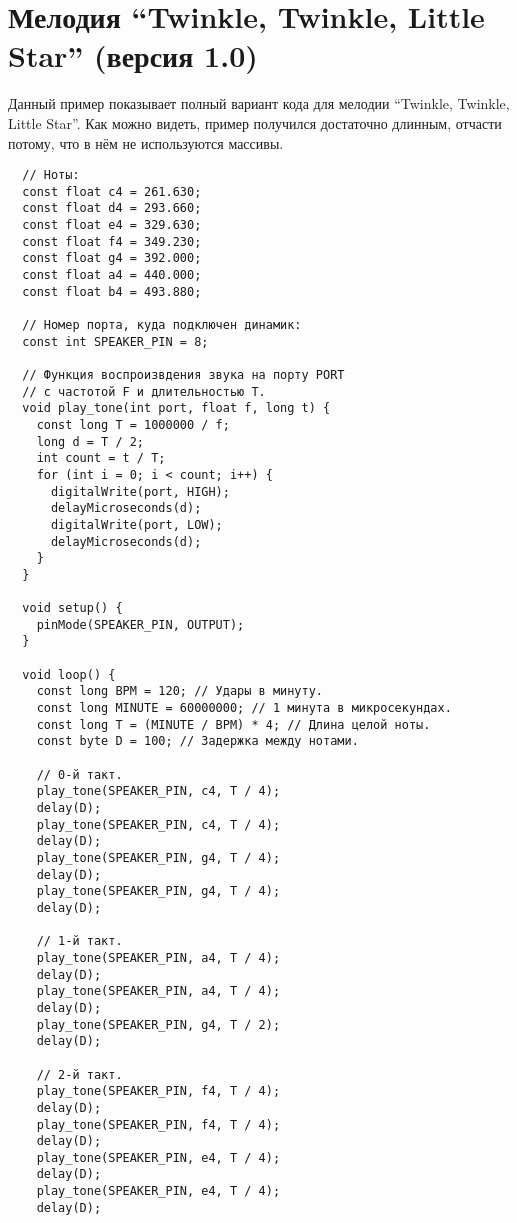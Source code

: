 \documentclass[../sparc.tex]{subfiles}
\begin{document}
\newpage
\chapter{Мелодия ``Twinkle, Twinkle, Little Star'' (версия 1.0)}
\label{app:twinkle-twinkle-little-star-01}

Данный пример показывает полный вариант кода для мелодии ``Twinkle, Twinkle,
Little Star''.  Как можно видеть, пример получился достаточно длинным, отчасти
потому, что в нём не используются массивы.

\begin{verbatim}
  // Ноты:
  const float c4 = 261.630;
  const float d4 = 293.660;
  const float e4 = 329.630;
  const float f4 = 349.230;
  const float g4 = 392.000;
  const float a4 = 440.000;
  const float b4 = 493.880;

  // Номер порта, куда подключен динамик:
  const int SPEAKER_PIN = 8;

  // Функция воспроизвдения звука на порту PORT
  // с частотой F и длительностью T.
  void play_tone(int port, float f, long t) {
    const long T = 1000000 / f;
    long d = T / 2;
    int count = t / T;
    for (int i = 0; i < count; i++) {
      digitalWrite(port, HIGH);
      delayMicroseconds(d);
      digitalWrite(port, LOW);
      delayMicroseconds(d);
    }
  }

  void setup() {
    pinMode(SPEAKER_PIN, OUTPUT);
  }

  void loop() {
    const long BPM = 120; // Удары в минуту.
    const long MINUTE = 60000000; // 1 минута в микросекундах.
    const long T = (MINUTE / BPM) * 4; // Длина целой ноты.
    const byte D = 100; // Задержка между нотами.

    // 0-й такт.
    play_tone(SPEAKER_PIN, c4, T / 4);
    delay(D);
    play_tone(SPEAKER_PIN, c4, T / 4);
    delay(D);
    play_tone(SPEAKER_PIN, g4, T / 4);
    delay(D);
    play_tone(SPEAKER_PIN, g4, T / 4);
    delay(D);

    // 1-й такт.
    play_tone(SPEAKER_PIN, a4, T / 4);
    delay(D);
    play_tone(SPEAKER_PIN, a4, T / 4);
    delay(D);
    play_tone(SPEAKER_PIN, g4, T / 2);
    delay(D);

    // 2-й такт.
    play_tone(SPEAKER_PIN, f4, T / 4);
    delay(D);
    play_tone(SPEAKER_PIN, f4, T / 4);
    delay(D);
    play_tone(SPEAKER_PIN, e4, T / 4);
    delay(D);
    play_tone(SPEAKER_PIN, e4, T / 4);
    delay(D);


\end{verbatim}
\end{document}
